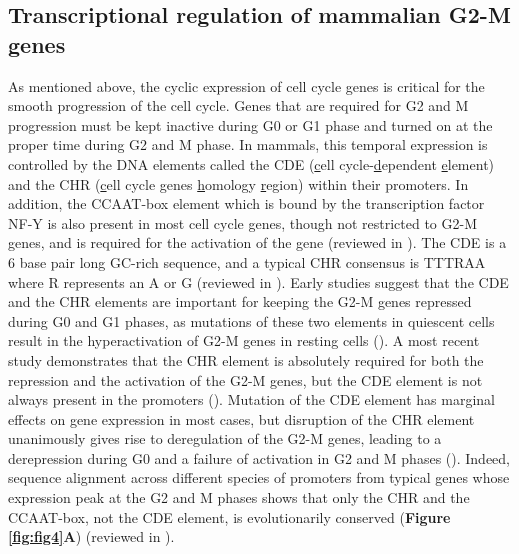 \subsection{Transcriptional regulation of mammalian G2-M genes}

As mentioned above, the cyclic expression of cell cycle genes is critical for the smooth progression of the cell cycle. Genes that are required for G2 and M progression must be kept inactive during G0 or G1 phase and turned on at the proper time during G2 and M phase. In mammals, this temporal expression is controlled by the DNA elements called the CDE (\underline{c}ell cycle-\underline{d}ependent \underline{e}lement) and the CHR (\underline{c}ell cycle genes \underline{h}omology \underline{r}egion) within their promoters. In addition, the CCAAT-box element which is bound by the transcription factor NF-Y is also present in most cell cycle genes, though not restricted to G2-M genes, and is required for the activation of the gene (reviewed in \cite{müller2010the}). The CDE is a 6 base pair long GC-rich sequence, and a typical CHR consensus is TTTRAA where R represents an A or G (reviewed in \cite{müller2010the}). Early studies suggest that the CDE and the CHR elements are important for keeping the G2-M genes repressed during G0 and G1 phases, as mutations of these two elements in quiescent cells result in the hyperactivation of G2-M genes in resting cells (\cite{lucibello1995periodic,tommasi1995in,zwicker1995cell}). A most recent study demonstrates that the CHR element is absolutely required for both the repression and the activation of the G2-M genes, but the CDE element is not always present in the promoters (\cite{müller2012the}). Mutation of the CDE element has marginal effects on gene expression in most cases, but disruption of the CHR element unanimously gives rise to deregulation of the G2-M genes, leading to a derepression during G0 and a failure of activation in G2 and M phases (\cite{müller2012the}). Indeed, sequence alignment across different species of promoters from typical genes whose expression peak at the G2 and M phases shows that only the CHR and the CCAAT-box, not the CDE element, is evolutionarily conserved (\textbf{Figure \ref{fig:fig4}A}) (reviewed in \cite{müller2010the}).

